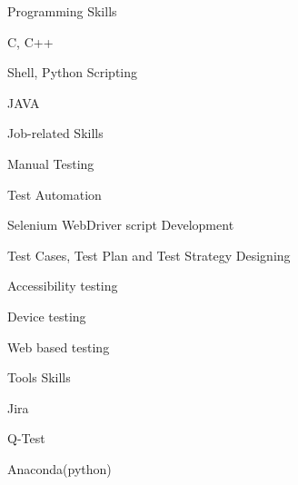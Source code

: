 

\begin{cvskills}

  \cvskill
    {Programming Skills} %
    {\begin{cvitems_3} %
        \item {C, C++}
        \item {Shell,  Python Scripting}
        \item {JAVA}
      \end{cvitems_3}} %

  \cvskill
    {Job-related Skills} %
    {\begin{cvitems_3} %
        \item {Manual Testing}
        \item {Test Automation}
        \item {Selenium WebDriver script Development}
        \item {Test Cases, Test Plan and Test Strategy Designing}
        \item {Accessibility testing}
        \item {Device testing}
        \item {Web based testing}
      \end{cvitems_3}} %
      
  \cvskill
    {Tools Skills} %
    {\begin{cvitems_3} %
        \item {Jira }
        \item {Q-Test}
        \item {Anaconda(python)}
      \end{cvitems_3}} %
      

\end{cvskills}
